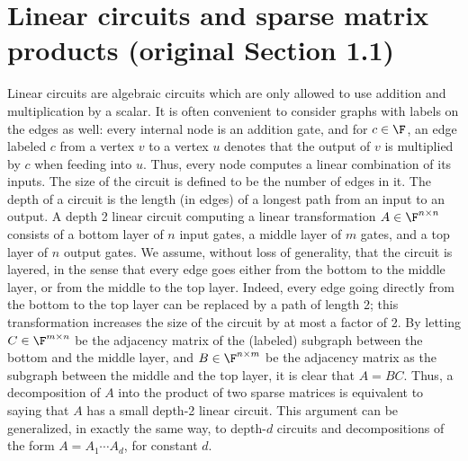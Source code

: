 \section*{Linear circuits and sparse matrix products (original Section 1.1)}
Linear circuits are algebraic circuits which are only allowed to use addition and multiplication by a scalar. It is often convenient to consider graphs with labels on the edges as well: every internal node is an addition gate, and for $c\in\F$, an edge labeled $c$ from a vertex $v$ to a vertex $u$ denotes that the output of $v$ is multiplied by $c$ when feeding into $u$. Thus, every node computes a linear combination of its inputs. The size of the circuit is defined to be the number of edges in it. The depth of a circuit is the length (in edges) of a longest path from an input to an output.
A depth 2 linear circuit computing a linear transformation $A\in\F^{n\times n}$ consists of a bottom layer of $n$ input gates, a middle layer of $m$ gates, and a top layer of $n$ output gates. We assume, without loss of generality, that the circuit is layered, in the sense that every edge goes either from the bottom to the middle layer, or from the middle to the top layer. Indeed, every edge going directly from the bottom to the top layer can be replaced by a path of length 2; this transformation increases the size of the circuit by at most a factor of 2.
By letting $C\in\F^{m\times n}$ be the adjacency matrix of the (labeled) subgraph between the bottom and the middle layer, and $B\in\F^{n\times m}$ be the adjacency matrix as the subgraph between the middle and the top layer, it is clear that $A=BC$. Thus, a decomposition of $A$ into the product of two sparse matrices is equivalent to saying that $A$ has a small depth-2 linear circuit. This argument can be generalized, in exactly the same way, to depth-$d$ circuits and decompositions of the form $A=A_1\cdots A_d$, for constant $d$.
